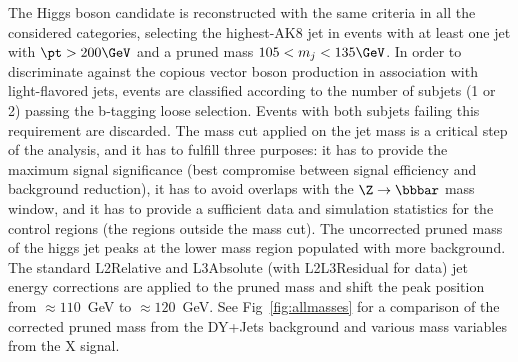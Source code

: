 The Higgs boson candidate is reconstructed with the same criteria in all the considered categories, selecting the highest-\pt AK8 jet in events with at least one jet with $\pt>200\GeV$ and a pruned mass $105 < m_j < 135 \GeV$. In order to discriminate against the copious vector boson production in association with light-flavored jets, events are classified according to the number of subjets (1 or 2) passing the b-tagging loose selection. Events with both subjets failing this requirement are discarded. 
The mass cut applied on the jet mass is a critical step of the analysis, and it has to fulfill three purposes: 
it has to provide the maximum signal significance (best compromise between 
signal efficiency and background reduction), it has to avoid overlaps with the 
$\Z \to \bbbar$ mass window, and it has to provide a sufficient data and 
simulation statistics for the control regions (the regions outside the mass 
cut). The uncorrected pruned mass of the higgs jet peaks at the lower mass region populated with more background. The standard 
{\sc L2Relative} and {\sc L3Absolute} (with {\sc L2L3Residual} for data) jet 
energy corrections are applied to the pruned mass and shift the peak position 
from $\approx 110$~GeV to $\approx 120$~GeV. See Fig~\ref{fig:allmasses} for a 
comparison of the corrected pruned mass from the DY+Jets background and various 
mass variables from the X signal.

